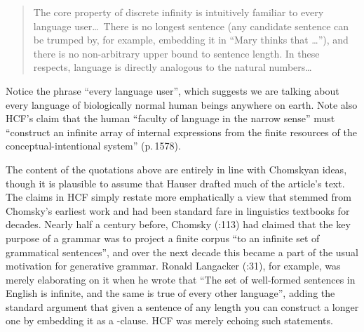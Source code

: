 \documentclass[output=paper,colorlinks,citecolor=brown
]{langscibook}
\begin{document}
\begin{quote}
The core property of discrete infinity is intuitively familiar to every
language user\ldots\ There is no longest sentence (any candidate sentence
can be trumped by, for example, embedding it in ``Mary thinks that \ldots''),
and there is no non-arbitrary upper bound to sentence length. In these
respects, language is directly analogous to the natural numbers\ldots
\end{quote}
Notice the phrase ``every language user'', which suggests we are talking
about every language of biologically normal human beings anywhere on
earth. Note also HCF's claim that the human ``faculty of language in the
narrow sense'' must ``construct an infinite array of internal expressions
from the finite resources of the conceptual-intentional system'' (p.\,1578).

The content of the quotations above are entirely in line with Chomskyan
ideas, though it is plausible to assume that Hauser drafted much of the
article's text. The claims in HCF simply restate more emphatically a
view that stemmed from Chomsky's earliest work and had been standard
fare in linguistics textbooks for decades. Nearly half a century before,
Chomsky (\citeyear{Chomsky56}:113) had claimed that the key purpose
of a grammar was to project a finite corpus ``to an infinite set of
grammatical sentences'', and over the next decade this became a part
of the usual motivation for generative grammar. Ronald Langacker
(\citeyear{Langacker68}:31), for example, was merely elaborating on
it when he wrote that ``The set of well-formed sentences in English
is infinite, and the same is true of every other language'', adding
the standard argument that given a sentence of any length you can
construct a longer one by embedding it as a -clause.
HCF was merely echoing such statements.
\end{document}
